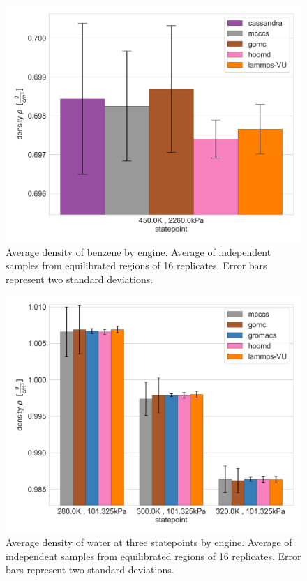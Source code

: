 \begin{figure}[h!]
    \centering
    \includegraphics[width=0.8\linewidth,keepaspectratio]{figures/rep_study/benzeneUA_summary.png}
    \caption{Average density of benzene by engine. Average of independent samples from equilibrated regions of 16 replicates. Error bars represent two standard deviations.}\label{fig:benzene_density}
\end{figure}

\begin{figure}[h!]
    \centering
    \includegraphics[width=0.8\linewidth,keepaspectratio]{figures/rep_study/waterSPCE_summary.png}
    \caption{Average density of water at three statepoints by engine. Average of independent samples from equilibrated regions of 16 replicates. Error bars represent two standard deviations.}\label{fig:water_density}
\end{figure}

